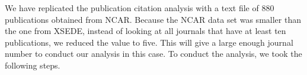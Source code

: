 \documentclass[10pt, conference, compsocconf]{IEEEtran}
\begin{document}

We have replicated the publication citation analysis with a text file of 880 publications obtained from NCAR. Because the NCAR data set was smaller than the one from XSEDE, instead of looking at all journals that have at least ten publications, we reduced the value to five. This will give a large enough journal number to conduct our analysis in this case. To conduct the analysis, we took the following steps.
\end{document}
